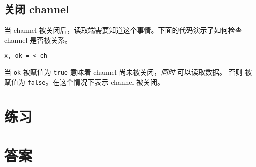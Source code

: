 \subsection{关闭 channel}
当 channel 被关闭后，读取端需要知道这个事情。下面的代码演示了如何检查 channel 是否被关系。
\begin{lstlisting}
x, ok = <-ch
\end{lstlisting}
当 \lstinline{ok} 被赋值为 \lstinline{true} 意味着 channel 尚未被关闭，\emph{同时} 可以读取数据。
否则  被赋值为 \lstinline{false}。在这个情况下表示 channel 被关闭。

\section{练习}




\cleardoublepage
\section{答案}
\shipoutAnswer

